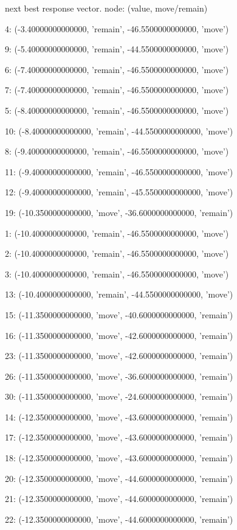  next best response vector.  node: (value, move/remain)


4: (-3.40000000000000, 'remain', -46.5500000000000, 'move')


9: (-5.40000000000000, 'remain', -44.5500000000000, 'move')


6: (-7.40000000000000, 'remain', -46.5500000000000, 'move')


7: (-7.40000000000000, 'remain', -46.5500000000000, 'move')


5: (-8.40000000000000, 'remain', -46.5500000000000, 'move')


10: (-8.40000000000000, 'remain', -44.5500000000000, 'move')


8: (-9.40000000000000, 'remain', -46.5500000000000, 'move')


11: (-9.40000000000000, 'remain', -46.5500000000000, 'move')


12: (-9.40000000000000, 'remain', -45.5500000000000, 'move')


19: (-10.3500000000000, 'move', -36.6000000000000, 'remain')


1: (-10.4000000000000, 'remain', -46.5500000000000, 'move')


2: (-10.4000000000000, 'remain', -46.5500000000000, 'move')


3: (-10.4000000000000, 'remain', -46.5500000000000, 'move')


13: (-10.4000000000000, 'remain', -44.5500000000000, 'move')


15: (-11.3500000000000, 'move', -40.6000000000000, 'remain')


16: (-11.3500000000000, 'move', -42.6000000000000, 'remain')


23: (-11.3500000000000, 'move', -42.6000000000000, 'remain')


26: (-11.3500000000000, 'move', -36.6000000000000, 'remain')


30: (-11.3500000000000, 'move', -24.6000000000000, 'remain')


14: (-12.3500000000000, 'move', -43.6000000000000, 'remain')


17: (-12.3500000000000, 'move', -43.6000000000000, 'remain')


18: (-12.3500000000000, 'move', -43.6000000000000, 'remain')


20: (-12.3500000000000, 'move', -44.6000000000000, 'remain')


21: (-12.3500000000000, 'move', -44.6000000000000, 'remain')


22: (-12.3500000000000, 'move', -44.6000000000000, 'remain')


